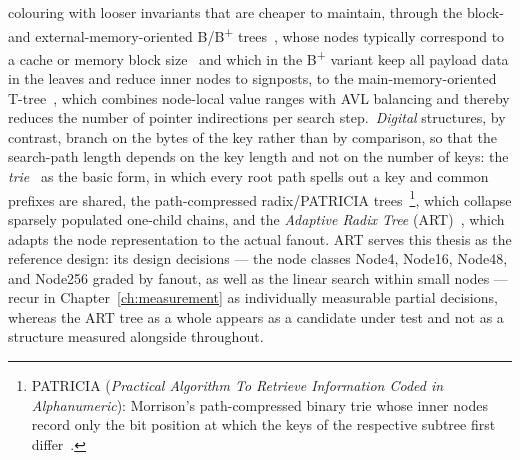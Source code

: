 \begin{nurlang}
colouring with looser invariants that are cheaper to maintain, through the block- and
external-memory-oriented
B/B\textsuperscript{+} trees~\cite{bayer1972btree,comer1979btree}, whose nodes typically correspond to a
cache or memory block size~\cite{graefe2001btree,hankins2003nodesize} and which in the
B\textsuperscript{+} variant keep all payload data in the leaves and reduce inner nodes to signposts,
to the main-memory-oriented
T-tree~\cite{lehman1986ttree}, which combines node-local value ranges with AVL balancing and thereby
reduces the number of pointer indirections per search step.\ \emph{Digital} structures, by contrast, branch on the bytes of the key
rather than by comparison, so that the search-path length depends on the key length and not on the
number of keys: the \emph{trie}~\cite{delabriandais1959trie,fredkin1960trie} as the basic form, in which every root
path spells out a key and common prefixes are shared, the
path-compressed radix/PATRICIA trees~\cite{morrison1968patricia}\footnote{PATRICIA
(\emph{Practical Algorithm To Retrieve Information Coded in Alphanumeric}): Morrison's path-compressed
binary trie whose inner nodes record only the bit position at which the keys of the respective subtree
first differ~\cite{morrison1968patricia}.}, which collapse sparsely populated
one-child chains,
and the \emph{Adaptive Radix Tree}
(ART)~\cite{leis2013art}, which adapts the node representation to the actual fanout.
ART serves this thesis as the reference design: its design decisions --- the node classes Node4, Node16,
Node48, and Node256 graded by fanout, as well as the linear search within small nodes --- recur in
Chapter~\ref{ch:measurement} as individually measurable partial decisions, whereas the ART tree as a
whole appears as a candidate under test and not as a structure measured alongside throughout.
\end{nurlang}

